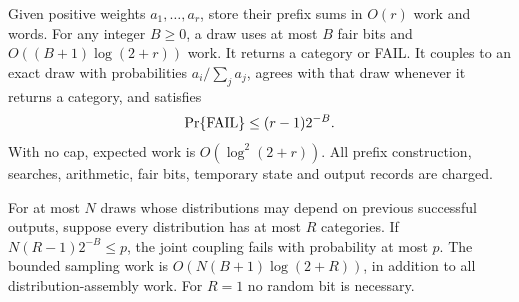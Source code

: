 \begin{proposition}
\label{prop:op3-fair-bit-categorical}
Given positive weights $a_1,\ldots,a_r$, store their prefix sums in
$O(r)$ work and words. For any integer $B\geq0$, a draw uses at most
$B$ fair bits and $O((B+1)\log(2+r))$ work. It returns a category or
\textnormal{FAIL}. It couples to an exact draw with probabilities
$a_i/\sum_j a_j$, agrees with that draw whenever it returns a category,
and satisfies
\[
 \Pr\{\textnormal{FAIL}\}\leq (r-1)2^{-B}.
\]
With no cap, expected work is $O(\log^2(2+r))$.
All prefix construction, searches, arithmetic, fair bits, temporary
state and output records are charged.

For at most $N$ draws whose distributions may depend on previous
successful outputs, suppose every distribution has at most $R$
categories. If $N(R-1)2^{-B}\leq p$, the joint coupling fails with
probability at most $p$. The bounded sampling work is
$O(N(B+1)\log(2+R))$, in addition to all distribution-assembly work.
For $R=1$ no random bit is necessary.
\end{proposition}
